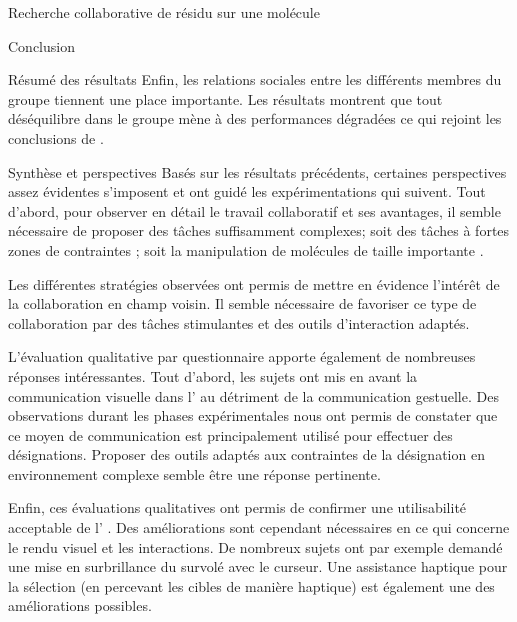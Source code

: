 \documentclass[myfrancais,ngerman,english,frenchb]{mythesis}
\begin{document}
\begin{mychapter}{Recherche collaborative de résidu sur une molécule}
\begin{mysection}{Conclusion}
\begin{mysubsection}{Résumé des résultats}
				Enfin, les relations sociales entre les différents membres du groupe tiennent une place importante.
				Les résultats montrent que tout déséquilibre dans le groupe mène à des performances dégradées ce qui rejoint les conclusions de .
			\end{mysubsection}
			\begin{mysubsection}{Synthèse et perspectives}
				Basés sur les résultats précédents, certaines perspectives assez évidentes s'imposent et ont guidé les expérimentations qui suivent.
				Tout d'abord, pour observer en détail le travail collaboratif et ses avantages, il semble nécessaire de proposer des tâches suffisamment complexes; soit des tâches à fortes zones de contraintes ; soit la manipulation de molécules de taille importante .

				Les différentes stratégies observées ont permis de mettre en évidence l'intérêt de la collaboration en champ voisin.
				Il semble nécessaire de favoriser ce type de collaboration par des tâches stimulantes et des outils d'interaction adaptés.

				L'évaluation qualitative par questionnaire apporte également de nombreuses réponses intéressantes.
				Tout d'abord, les sujets ont mis en avant la communication visuelle dans l' au détriment de la communication gestuelle.
				Des observations durant les phases expérimentales nous ont permis de constater que ce moyen de communication est principalement utilisé pour effectuer des désignations.
				Proposer des outils adaptés aux contraintes de la désignation en environnement complexe semble être une réponse pertinente.

				Enfin, ces évaluations qualitatives ont permis de confirmer une utilisabilité acceptable de l' \myShaddock.
				Des améliorations sont cependant nécessaires en ce qui concerne le rendu visuel et les interactions.
				De nombreux sujets ont par exemple demandé une mise en surbrillance du  survolé avec le curseur.
				Une assistance haptique pour la sélection (en percevant les cibles de manière haptique) est également une des améliorations possibles.
			\end{mysubsection}
		\end{mysection}
	\end{mychapter}
\end{document}
